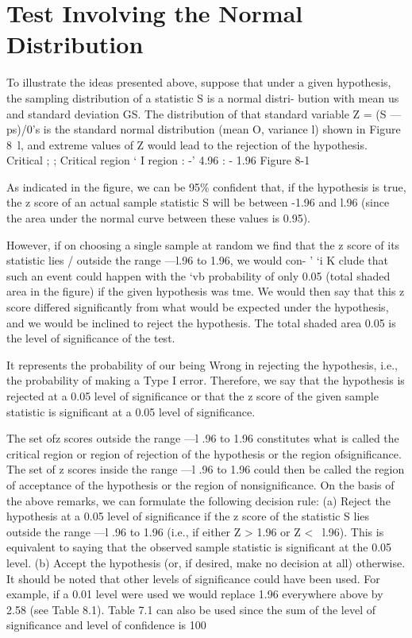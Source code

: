\section{Test Involving the Normal Distribution}
To illustrate the ideas presented above, suppose that under a given
hypothesis, the sampling distribution of a statistic S is a normal distri-
bution with mean us and standard deviation GS. The distribution of that
standard variable Z = (S — ps)/0's is the standard normal distribution
(mean O, variance l) shown in Figure 8~l, and extreme values of Z
would lead to the rejection of the hypothesis.
Critical ; ; Critical
region ‘ I region
: -' 4.96 : - 1.96
Figure 8-1



As indicated in the ﬁgure, we can be 95\% conﬁdent that, if the
hypothesis is true, the z score of an actual sample statistic S will be
between -1.96 and l.96 (since the area under the normal curve between
these values is 0.95).

However, if on choosing a single sample at random we ﬁnd that the z score of its statistic lies /
outside the range —l.96 to 1.96, we would con- ' ‘i K
clude that such an event could happen with the ‘vb 
probability of only 0.05 (total shaded area in the ﬁgure) if the given hypothesis was tme. We would then say that this z score differed significantly from
what would be expected under the hypothesis, and we would be inclined to reject the hypothesis.
The total shaded area 0.05 is the level of signiﬁcance of the test. 

It represents the probability of our being Wrong in rejecting the hypothesis, i.e., the probability of making a Type I error. Therefore, we say that the hypothesis is rejected at a 0.05 level of signiﬁcance or that the z
score of the given sample statistic is signiﬁcant at a 0.05 level of significance.

The set ofz scores outside the range —l .96 to 1.96 constitutes what
is called the critical region or region of rejection of the hypothesis or the
region ofsignificance. The set of z scores inside the range —l .96 to 1.96
could then be called the region of acceptance of the hypothesis or the
region of nonsigniﬁcance.
On the basis of the above remarks, we can formulate the following
decision rule:
(a) Reject the hypothesis at a 0.05 level of signiﬁcance if the z
score of the statistic S lies outside the range —l .96 to 1.96 (i.e.,
if either Z > 1.96 or Z < ~l.96). This is equivalent to saying that
the observed sample statistic is signiﬁcant at the 0.05 level.
(b) Accept the hypothesis (or, if desired, make no decision at all)
otherwise.
It should be noted that other levels of signiﬁcance could have been
used. For example, if a 0.01 level were used we would replace 1.96
everywhere above by 2.58 (see Table 8.1). Table 7.1 can also be used
since the sum of the level of signiﬁcance and level of conﬁdence is
100%


